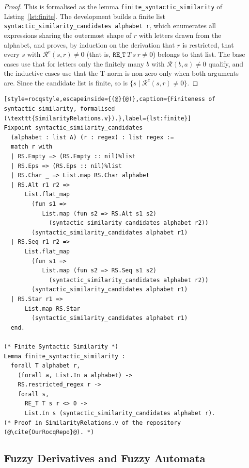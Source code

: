 \begin{proof}
This is formalised as the lemma \texttt{finite\_syntactic\_similarity} of
Listing~\ref{lst:finite}. The development builds a finite list
\texttt{syntactic\_similarity\_candidates alphabet r}, which enumerates all
expressions sharing the outermost shape of $r$ with letters drawn from the
alphabet, and proves, by induction on the derivation that $r$ is restricted, that
every $s$ with $\mathcal{R}^{e}(s,r)\neq 0$ (that is, $\texttt{RE\_T}\ T\ s\ r\neq0$)
belongs to that list. The base cases use that for letters only the finitely many
$b$ with $\mathcal{R}(b,a)\neq 0$ qualify, and the inductive cases use that the
T-norm is non-zero only when both arguments are. Since the candidate list is finite,
so is $\{s\mid\mathcal{R}^{e}(s,r)\neq 0\}$.
\end{proof}

\begin{lstlisting}[style=rocqstyle,escapeinside={(@}{@)},caption={Finiteness of syntactic similarity, formalised (\texttt{SimilarityRelations.v}).},label={lst:finite}]
Fixpoint syntactic_similarity_candidates
  (alphabet : list A) (r : regex) : list regex :=
  match r with
  | RS.Empty => (RS.Empty :: nil)%list
  | RS.Eps => (RS.Eps :: nil)%list
  | RS.Char _ => List.map RS.Char alphabet
  | RS.Alt r1 r2 =>
      List.flat_map
        (fun s1 =>
           List.map (fun s2 => RS.Alt s1 s2)
             (syntactic_similarity_candidates alphabet r2))
        (syntactic_similarity_candidates alphabet r1)
  | RS.Seq r1 r2 =>
      List.flat_map
        (fun s1 =>
           List.map (fun s2 => RS.Seq s1 s2)
             (syntactic_similarity_candidates alphabet r2))
        (syntactic_similarity_candidates alphabet r1)
  | RS.Star r1 =>
      List.map RS.Star
        (syntactic_similarity_candidates alphabet r1)
  end.

(* Finite Syntactic Similarity *)
Lemma finite_syntactic_similarity :
  forall T alphabet r,
    (forall a, List.In a alphabet) ->
    RS.restricted_regex r ->
    forall s,
      RE_T T s r <> 0 ->
      List.In s (syntactic_similarity_candidates alphabet r).
(* Proof in SimilarityRelations.v of the repository (@\cite{OurRocqRepo}@). *)
\end{lstlisting}


\subsection{Fuzzy Derivatives and Fuzzy Automata}\label{sec:fuzzy-derivatives}


